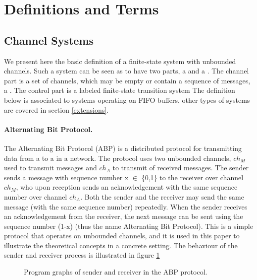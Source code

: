 \section{Definitions and Terms}
\subsection{Channel Systems}
We present here the basic definition of a finite-state system with unbounded channels. Such a system can be seen as to have two parts, a  and a . The channel part is a set of channels, which may be empty or contain a sequence of messages, a . The control part is a labeled finite-state transition system The definition below is associated to systems operating on FIFO buffers, other types of systems are covered in section \ref{extensions}. 

\paragraph{Alternating Bit Protocol.} The Alternating Bit Protocol (ABP) is a distributed protocol for transmitting data from a  to a  in a network. The protocol uses two unbounded channels, $ch_M$ used to transmit messages and $ch_A$ to transmit  of received messages. The sender sends a message with sequence number x $\in$ \{0,1\} to the receiver over channel $ch_M$, who upon reception sends an acknowledgement with the same sequence number over channel $ch_A$. Both the sender and the receiver may send the same message (with the same sequence number) repeatedly. When the sender receives an acknowledgement from the receiver, the next message can be sent using the sequence number (1-x) (thus the name Alternating Bit Protocol). This is a simple protocol that operates on unbounded channels, and it is used in this paper to illustrate the theoretical concepts in a concrete setting. The behaviour of the sender and receiver process is illustrated in figure \ref{abpgraph}

\begin{figure}[h!]
\subfloat[Sender]{\label{fig:in}
\abpsender{}
}
\subfloat[Receiver]{\label{fig:in}
\abpreceiver{}
}
\caption{Program graphs of sender and receiver in the ABP protocol.}
\label{abpgraph}
\end{figure}


